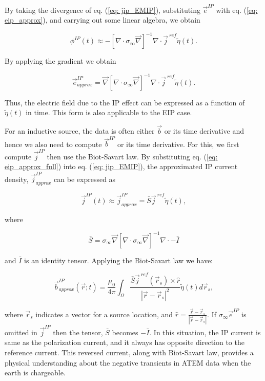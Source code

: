 \documentclass[extra,mreferee]{gji}
\renewcommand{\div}{\nabla\cdot}
\newcommand{\grad}{\vec \nabla}
\newcommand{\siginf}{\sigma_\infty}
\renewcommand {\j}  { {\vec j} }
\renewcommand {\b}  { {\vec b} }
\newcommand {\e}  { {\vec e} }
\newcommand{\peta}{\tilde{\eta}}
\newcommand{\jref}{\j^{\ ref}}
\begin{document}
By taking the divergence of  eq. (\ref{eq: jip_EMIP}), substituting  $\e^{IP}$ with eq. (\ref{eq: eip_approx}), and carrying out some linear algebra, we obtain
\begin{linenomath*}
\begin{equation}
  \phi^{IP}(t) \approx -[\div \siginf\grad]^{-1}\div\jref\peta(t).
  \label{eq: phiIPapprox_general}
\end{equation}
\end{linenomath*}
By applying the gradient we obtain 
\begin{linenomath*}
\begin{equation}
    \e^{IP}_{approx} = \grad[\div \siginf\grad]^{-1}\div\jref\peta(t).
    \label{eq: eip_approx_full}
\end{equation}
\end{linenomath*}
Thus, the electric field due to the IP effect can be expressed as a function of $\peta(t)$ in time. 
This form is also applicable to the  EIP case.   

For an inductive source, the data is often either $\b$ or its time derivative and hence we also need to compute $\b^{IP}$ or its time derivative.
For this, we first compute $\j^{IP}$ then use the Biot-Savart law. 
By substituting eq. (\ref{eq: eip_approx_full}) into eq. (\ref{eq: jip_EMIP}), the approximated IP current density, $\j^{IP}_{approx}$ can be expressed as
\begin{linenomath*}
\begin{equation}
  \j^{IP}(t) \approx \j^{IP}_{approx} = \bar{S}\jref\peta(t),
  \label{eq: jip_approx}
\end{equation}
\end{linenomath*}
where
\begin{linenomath*}
\begin{equation}
  \bar{S} = \siginf\grad[\div \siginf\grad]^{-1}\div-\bar{I}
\end{equation}
\end{linenomath*}
and $\bar{I}$ is an identity tensor. 
Applying the Biot-Savart law we have:
\begin{linenomath*}
\begin{equation}
  \b^{IP}_{approx}(\vec{r}; t) = \frac{\mu_0}{4\pi}\int_{\Omega}  \frac{\bar{S}\j^{\ ref}(\vec{r}_s)\times\hat{r}}{|\vec{r}-\vec{r}_s|^2}\peta(t)d\vec{r}_s,
  \label{eq: BiotbIP_approx}
\end{equation}
\end{linenomath*}
where $\vec{r}_s$ indicates a vector for a source location, and $\hat{r}=\frac{\vec{r}-\vec{r}_s}{|\vec{r}-\vec{r}_s|}$.
If $\siginf\e^{IP}$ is omitted in  $\j^{IP}$ then the tensor, $\bar{S}$ becomes $-\bar{I}$. 
In this situation, the IP current is same as the polarization current, and it always has opposite direction to the reference current. 
This reversed current, along with Biot-Savart law,  provides a physical understanding about the negative transients in ATEM data when the earth is chargeable. 
\end{document}

